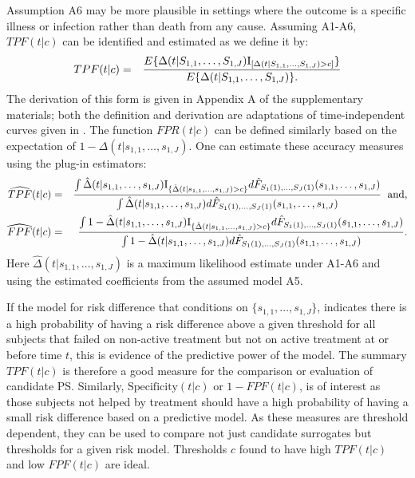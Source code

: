 \documentclass[times, doublespace]{simauth}
\begin{document}
Assumption A6 may be more plausible in settings where the outcome is a specific illness or infection rather than death from any cause. Assuming A1-A6, $TPF(t|c)$ can be identified and estimated as we define it by:
\begin{eqnarray*}
TPF(t|c)&=& E\{\Delta(t|S_{1,1}, \dots, S_{1,J})\mathrm{I}_{[\Delta(t|S_{1,1}, \dots, S_{1,J})>c]}\} \over E\{\Delta(t|S_{1,1}, \dots, S_{1,J})\}.
\end{eqnarray*}
The derivation of this form is given in Appendix A of the supplementary materials; both the definition and derivation are adaptations of time-independent curves given in \citet{Huang12b}. The function $FPR(t|c)$ can be defined similarly based on the expectation of $1-\Delta(t|s_{1,1}, \dots, s_{1,J})$. One can estimate these accuracy measures using the plug-in estimators:
\begin{eqnarray*}
\widehat{TPF}(t|c)&=& {\int \hat{\Delta}(t|s_{1,1}, \dots, s_{1,J})\mathrm{I}_{\{\hat{\Delta}(t|s_{1,1}, \dots, s_{1,J})>c\}}d\hat{F}_{S_1(1), \ldots, S_J(1)}(s_{1,1}, \dots, s_{1,J}) \over \int \hat{\Delta}(t|s_{1,1}, \dots, s_{1,J})d\hat{F}_{S_1(1), \ldots, S_J(1)}(s_{1,1}, \dots, s_{1,J})} \hspace{2mm}\mbox{and},\\
\widehat{FPF}(t|c)&=& {\int 1-\hat{\Delta}(t|s_{1,1}, \dots, s_{1,J})\mathrm{I}_{\{\hat{\Delta}(t|s_{1,1}, \dots, s_{1,J})>c\}}d\hat{F}_{S_1(1), \ldots, S_J(1)}(s_{1,1}, \dots, s_{1,J}) \over \int 1-\hat{\Delta}(t|s_{1,1}, \dots, s_{1,J})d\hat{F}_{S_1(1), \ldots, S_J(1)}(s_{1,1}, \dots, s_{1,J})}.\\
\end{eqnarray*}
Here $\hat{\Delta}(t|s_{1,1}, \dots, s_{1,J})$ is a maximum likelihood estimate under A1-A6 and using the estimated coefficients from the assumed model A5. 

If the model for risk difference that conditions on $\{s_{1,1}, \ldots, s_{1,J}\}$, indicates there is a high probability of having a risk difference above a given threshold for all subjects that failed on non-active treatment but not on active treatment at or before time $t$, this is evidence of the predictive power of the model. The summary $TPF(t|c)$ is therefore a good measure for the comparison or evaluation of candidate PS. Similarly, $\mbox{Specificity}(t|c)$ or $1-FPF(t|c)$, is of interest as those subjects not helped by treatment should have a high probability of having a small risk difference based on a predictive model. As these measures are threshold dependent, they can be used to compare not just candidate surrogates but thresholds for a given risk model. Thresholds $c$ found to have high $TPF(t|c)$ and low $FPF(t|c)$ are ideal. 
\end{document}
